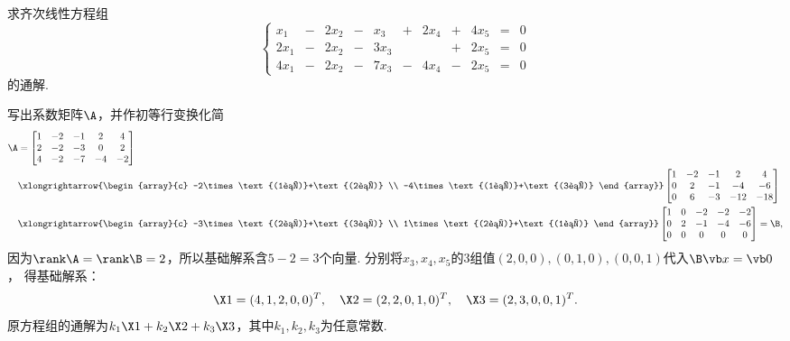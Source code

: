\begin{example}
求齐次线性方程组\[
	\left\{ \begin{array}{*{11}{r}}
		x_1 &-& 2 x_2 &-& x_3 &+& 2 x_4 &+& 4 x_5 &=& 0 \\
		2 x_1 &-& 2 x_2 &-& 3 x_3 && &+& 2 x_5 &=& 0 \\
		4 x_1 &-& 2 x_2 &-& 7 x_3 &-& 4 x_4 &-& 2 x_5 &=& 0
	\end{array} \right.
\]的通解.
\begin{solution}
写出系数矩阵\(\A\)，并作初等行变换化简
\begin{align*}
	\A &= \begin{bmatrix}
		1 & -2 & -1 & 2 & 4 \\
		2 & -2 & -3 & 0 & 2 \\
		4 & -2 & -7 & -4 & -2
	\end{bmatrix} \\
	&\xlongrightarrow{\begin{array}{c}
		-2\times\text{(1行)}+\text{(2行)} \\
		-4\times\text{(1行)}+\text{(3行)}
	\end{array}}
	\begin{bmatrix}
		1 & -2 & -1 & 2 & 4 \\
		0 & 2 & -1 & -4 & -6 \\
		0 & 6 & -3 & -12 & -18
	\end{bmatrix} \\
	&\xlongrightarrow{\begin{array}{c}
		-3\times\text{(2行)}+\text{(3行)} \\
		1\times\text{(2行)}+\text{(1行)}
	\end{array}}
	\begin{bmatrix}
		1 & 0 & -2 & -2 & -2 \\
		0 & 2 & -1 & -4 & -6 \\
		0 & 0 & 0 & 0 & 0
	\end{bmatrix}
	= \B,
\end{align*}
因为\(\rank\A=\rank\B=2\)，所以基础解系含\(5-2=3\)个向量.
分别将\(x_3,x_4,x_5\)的3组值\((2,0,0),(0,1,0),(0,0,1)\)代入\(\B\x=\vb0\)，
得基础解系：\[
	\X1 = (4,1,2,0,0)^T, \quad
	\X2 = (2,2,0,1,0)^T, \quad
	\X3 = (2,3,0,0,1)^T.
\]
原方程组的通解为\(k_1 \X1 + k_2 \X2 + k_3 \X3\)，其中\(k_1,k_2,k_3\)为任意常数.
\end{solution}
\end{example}

